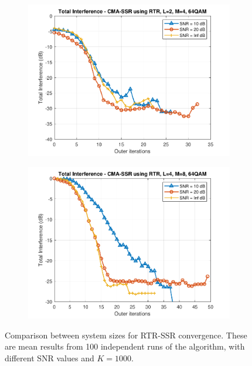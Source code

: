 \begin{figure}
\begin{subfigure}[b]{0.45\textwidth}
		\includegraphics[width=\linewidth]{./figs/BF_RTR_TI_64QAM_L=2_M=4_K=1000.pdf}
		\label{fig:rtr_ti64_24}
	\end{subfigure}
	\begin{subfigure}[b]{0.45\textwidth}
		\includegraphics[width=\linewidth]{./figs/BF_RTR_TI_64QAM_L=4_M=8_K=1000.pdf}
		\label{fig:rtr_ti64_48}
	\end{subfigure}
	\caption{Comparison between system sizes for RTR-SSR convergence. These are mean results from 100 independent runs of the algorithm, with different SNR values and $K=1000$.}
	\label{fig:CMA_RTR_size_qpsk}
\end{figure}


